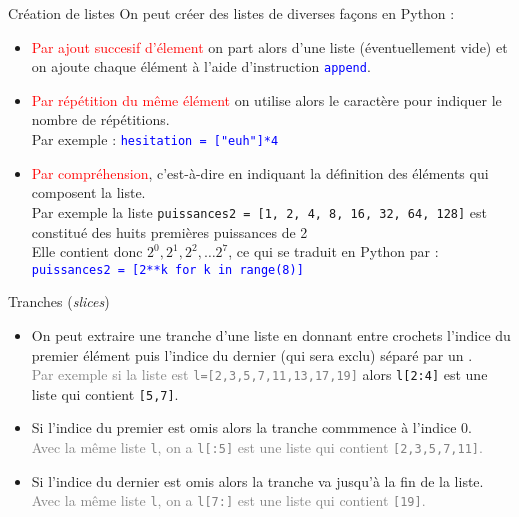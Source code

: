 \documentclass[10pt]{beamer}
\begin{document}
\begin{frame}[fragile]{\Ctitle}{\stitle}
	\begin{alertblock}{Création de listes}
		On peut créer des listes de diverses façons en Python :
		\begin{itemize}
			\item<2-> \textcolor{red}{Par ajout succesif d'élement} on part alors d'une liste (éventuellement vide) et on ajoute chaque élément à l'aide d'instruction \textcolor{blue}{\tt append}.
			\item<3-> \textcolor{red}{Par répétition du même élément} on utilise alors le caractère \textcolor{blue}{\tt *} pour indiquer le nombre de répétitions. \\
				\onslide<4-> {Par exemple : \textcolor{blue}{\tt hesitation = ["euh"]*4}}
			\item<6->	 \textcolor{red}{Par compréhension}, c'est-à-dire en indiquant la définition des éléments qui composent la liste. \\
				\onslide<7-> {Par exemple la liste {\tt puissances2 = [1, 2, 4, 8, 16, 32, 64, 128]} est constitué des huits premières puissances de 2} \\
				\onslide<8-> {Elle contient donc $2^0, 2^1, 2^2, \dots 2^7$, ce qui se traduit en Python par :}\\
				\onslide<9-> \textcolor{blue}{\tt puissances2 = [2**k for k in range(8)]}
		\end{itemize}
	\end{alertblock}
\end{frame}

\begin{frame}[fragile]{\Ctitle}{\stitle}
	\begin{alertblock}{Tranches (\textit{slices})}
		\begin{itemize}
			\item<1->On peut extraire une tranche d'une liste en donnant entre crochets l'indice du premier élément puis l'indice du dernier (qui sera exclu) séparé par un \kw{:}.\\
			\onslide<2->\textcolor{gray}{\small Par exemple si la liste est {\tt l=[2,3,5,7,11,13,17,19]}} alors {\tt l[2:4]} est une liste qui contient {\tt [5,7]}.
			\item<3-> Si l'indice du premier est omis alors la tranche commmence à l'indice 0.\\
				\onslide<4->\textcolor{gray}{\small Avec la même liste {\tt l}, on a {\tt l[:5]} est une liste qui contient {\tt [2,3,5,7,11]}.}
			\item<5-> Si l'indice du dernier est omis alors la tranche va jusqu'à la fin de la liste.\\
				\onslide<6->\textcolor{gray}{\small Avec la même liste {\tt l}, on a {\tt l[7:]} est une liste qui contient {\tt [19]}.}
		\end{itemize}
	\end{alertblock}
\end{frame}
\end{document}
